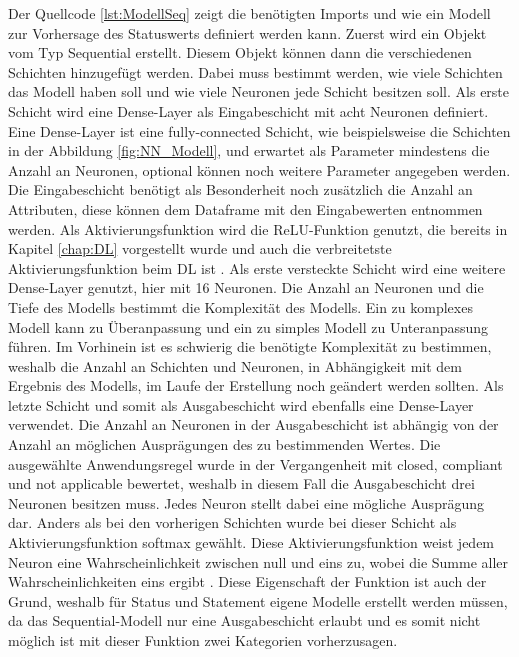 Der Quellcode \ref{lst:ModellSeq} zeigt die benötigten Imports und wie ein Modell zur Vorhersage des Statuswerts definiert werden kann. Zuerst wird ein Objekt vom Typ Sequential erstellt. Diesem Objekt 
können dann die verschiedenen Schichten hinzugefügt werden. Dabei muss bestimmt werden, wie viele Schichten das Modell haben soll und wie viele Neuronen jede Schicht besitzen soll.
Als erste Schicht wird eine Dense-Layer als Eingabeschicht mit acht Neuronen definiert. Eine Dense-Layer ist eine fully-connected Schicht,
wie beispielsweise die Schichten in der Abbildung \ref{fig:NN_Modell}, und erwartet als Parameter mindestens die Anzahl an Neuronen, optional können noch weitere Parameter angegeben werden.
Die Eingabeschicht benötigt als Besonderheit noch zusätzlich die Anzahl an Attributen, diese können dem Dataframe mit den Eingabewerten entnommen werden. Als Aktivierungsfunktion wird
die \ac{ReLU}-Funktion genutzt, die bereits in Kapitel \ref{chap:DL} vorgestellt wurde und auch die verbreitetste Aktivierungsfunktion beim \ac{DL} ist \cite[vgl. S.102]{DL_PY}. 
Als erste versteckte Schicht wird eine weitere Dense-Layer genutzt, hier mit 16 Neuronen. 
Die Anzahl an Neuronen und die Tiefe des Modells bestimmt die Komplexität des Modells. Ein zu komplexes Modell kann zu Überanpassung und ein zu simples Modell zu Unteranpassung führen.
Im Vorhinein ist es schwierig die benötigte Komplexität zu bestimmen, weshalb die Anzahl an Schichten und Neuronen, in Abhängigkeit mit dem Ergebnis des Modells, im Laufe der Erstellung noch geändert 
werden sollten. Als letzte Schicht und somit als Ausgabeschicht wird ebenfalls eine Dense-Layer verwendet. Die Anzahl an Neuronen in der Ausgabeschicht ist abhängig von der Anzahl an 
möglichen Ausprägungen des zu bestimmenden Wertes. Die ausgewählte Anwendungsregel wurde in der Vergangenheit mit \glqq closed\grqq{}, \glqq compliant\grqq{} und \glqq not applicable\grqq{} bewertet,
weshalb in diesem Fall die Ausgabeschicht drei Neuronen besitzen muss. Jedes Neuron stellt dabei eine mögliche Ausprägung dar. Anders als bei den vorherigen Schichten wurde bei dieser Schicht 
als Aktivierungsfunktion \glqq softmax\grqq{} gewählt. Diese Aktivierungsfunktion weist jedem Neuron eine Wahrscheinlichkeit zwischen null und eins zu, wobei die Summe aller Wahrscheinlichkeiten 
eins ergibt \cite{KerasDoc}. Diese Eigenschaft der Funktion ist auch der Grund, weshalb für Status und Statement eigene Modelle erstellt werden müssen, da das Sequential-Modell nur eine Ausgabeschicht
erlaubt und es somit nicht möglich ist mit dieser Funktion zwei Kategorien vorherzusagen. 

